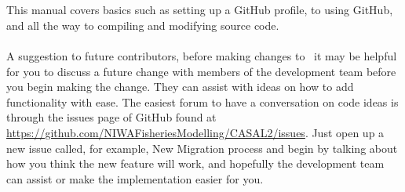\\\\
This manual covers basics such as setting up a GitHub profile, to using GitHub, and all the way to compiling and modifying source code. 
\\\\
A suggestion to future contributors, before making changes to \CNAME\ it may be helpful for you to discuss a future change with members of the development team before you begin making the change. They can assist with ideas on how to add functionality with ease. The easiest forum to have a conversation on code ideas is through the issues page of GitHub found at \url{https://github.com/NIWAFisheriesModelling/CASAL2/issues}. Just open up a new issue called, for example, New Migration process and begin by talking about how you think the new feature will work, and hopefully the development team can assist or make the implementation easier for you.
